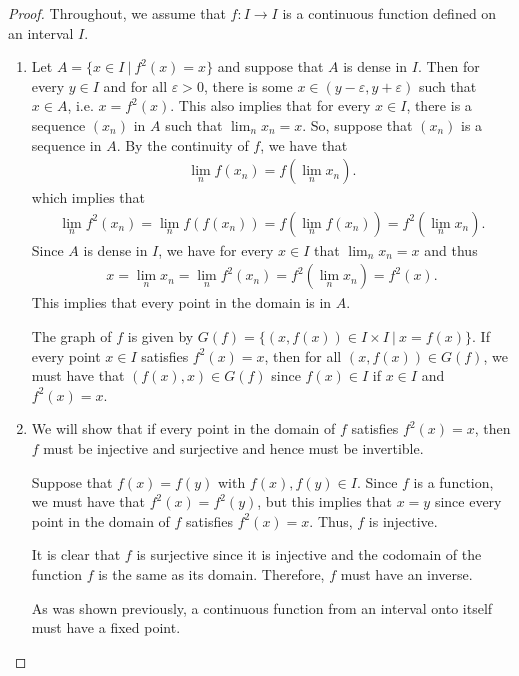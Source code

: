 \begin{proof}
  Throughout, we assume that $f: I \to I$ is a continuous function defined on an interval $I$.

  \begin{enumerate}
    \item Let $A = \{x \in I \ |\ f^2(x) = x\}$ and suppose that $A$
      is dense in $I$. Then for every $y\in I$ and for all $\varepsilon >0$,
      there is some $x\in(y-\varepsilon, y+\varepsilon)$ such that $x \in A$, i.e. $x= f^2(x)$.
      This also implies that for every $x \in I$, there is a sequence $(x_n)$ in $A$
      such that $\lim_n x_n = x$. So, suppose that $(x_n)$ is a sequence in $A$.
      By the continuity of $f$, we have that
      \begin{align*}
        \lim_n f(x_n) = f(\lim_n x_n).
      \end{align*}
      which implies that
      \begin{align*}
        \lim_n f^2(x_n) = \lim_n f(f(x_n)) = f(\lim_n f(x_n)) = f^2(\lim_n x_n).
      \end{align*}
      Since $A$ is dense in $I$, we have for every $x\in I$ that $\lim_n x_n = x$ and thus
      \begin{align*}
        x = \lim_n x_n = \lim_n f^2(x_n) = f^2(\lim_n x_n) = f^2(x).
      \end{align*}
      This implies that every point in the domain is in $A$.

      The graph of $f$ is given by $G(f) = \{ (x, f(x)) \in I \times I \ |\ x = f(x)\}$. If
      every point $x \in I$ satisfies $f^2(x) = x$, then for all $(x, f(x)) \in G(f)$, we must have
      that $(f(x), x) \in G(f)$ since $f(x) \in I$ if $x \in I$ and
      $f^2(x) = x$.

    \item We will show that if every point in the domain of $f$ satisfies $f^2(x) =x$,
      then $f$ must be injective and surjective and hence must be invertible.

      Suppose that $f(x) = f(y)$ with $f(x), f(y) \in I$. Since $f$ is a function, we must have
      that $f^2(x) = f^2(y)$, but this implies that $x =y$ since every point in the domain of $f$ satisfies $f^2(x) =x$.
      Thus, $f$ is injective.

      It is clear that $f$ is surjective since it is injective and the codomain of the function $f$ is
      the same as its domain. Therefore, $f$ must have an inverse.

      As was shown previously, a continuous function from an interval onto itself
      must have a fixed point.


\end{enumerate}
\end{proof}
